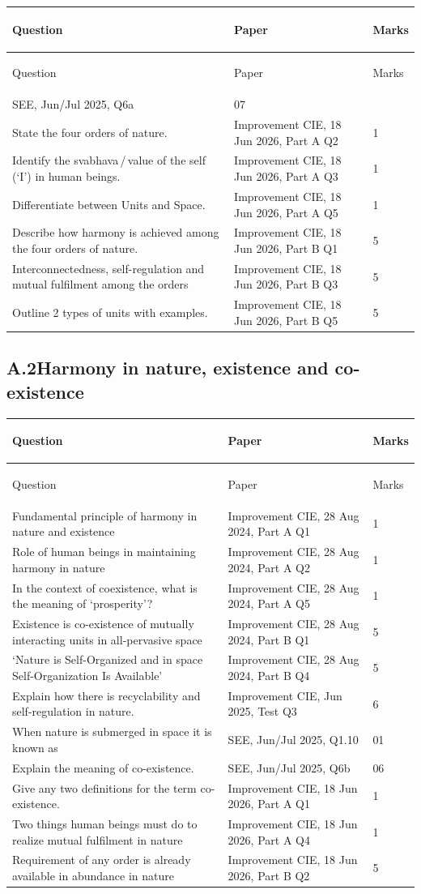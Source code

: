 \documentclass[11pt,a4paper,oneside]{book}
\newcommand{\hdr}[1]{{\sffamily\bfseries\color{white}\strut #1}}
\newenvironment{idxtable}
  {\renewcommand{\arraystretch}{1.3}%
   \arrayrulecolor{rulegrey}%
   \setlength{\LTpre}{6pt}\setlength{\LTpost}{4pt}%
   \begin{longtable}{P{104mm} P{40mm} C{13mm}}
   \rowcolor{slate}
   \hdr{Question} & \hdr{Paper} & \hdr{Marks} \\ \hline \endfirsthead
   \rowcolor{slate}
   \hdr{Question} & \hdr{Paper} & \hdr{Marks} \\ \hline \endhead}
  {\end{longtable}}
\begin{document}
\begin{idxtable}
  SEE, Jun/Jul 2025, Q6a & 07 \\ \hline
State the four orders of nature. &
  Improvement CIE, 18 Jun 2026, Part A Q2 & 1 \\ \hline
Identify the svabhava\,/\,value of the self (`I') in human beings. &
  Improvement CIE, 18 Jun 2026, Part A Q3 & 1 \\ \hline
Differentiate between Units and Space. &
  Improvement CIE, 18 Jun 2026, Part A Q5 & 1 \\ \hline
Describe how harmony is achieved among the four orders of nature. &
  Improvement CIE, 18 Jun 2026, Part B Q1 & 5 \\ \hline
Interconnectedness, self-regulation and mutual fulfilment among the orders &
  Improvement CIE, 18 Jun 2026, Part B Q3 & 5 \\ \hline
Outline 2 types of units with examples. &
  Improvement CIE, 18 Jun 2026, Part B Q5 & 5 \\ \hline
\end{idxtable}

\subsection*{A.2\enspace Harmony in nature, existence and co-existence}

\begin{idxtable}
Fundamental principle of harmony in nature and existence &
  Improvement CIE, 28 Aug 2024, Part A Q1 & 1 \\ \hline
Role of human beings in maintaining harmony in nature &
  Improvement CIE, 28 Aug 2024, Part A Q2 & 1 \\ \hline
In the context of coexistence, what is the meaning of `prosperity'? &
  Improvement CIE, 28 Aug 2024, Part A Q5 & 1 \\ \hline
Existence is co-existence of mutually interacting units in all-pervasive
  space & Improvement CIE, 28 Aug 2024, Part B Q1 & 5 \\ \hline
`Nature is Self-Organized and in space Self-Organization Is Available' &
  Improvement CIE, 28 Aug 2024, Part B Q4 & 5 \\ \hline
Explain how there is recyclability and self-regulation in nature. &
  Improvement CIE, Jun 2025, Test Q3 & 6 \\ \hline
When nature is submerged in space it is known as &
  SEE, Jun/Jul 2025, Q1.10 & 01 \\ \hline
Explain the meaning of co-existence. & SEE, Jun/Jul 2025, Q6b & 06 \\ \hline
Give any two definitions for the term co-existence. &
  Improvement CIE, 18 Jun 2026, Part A Q1 & 1 \\ \hline
Two things human beings must do to realize mutual fulfilment in nature &
  Improvement CIE, 18 Jun 2026, Part A Q4 & 1 \\ \hline
Requirement of any order is already available in abundance in nature &
  Improvement CIE, 18 Jun 2026, Part B Q2 & 5 \\ \hline
\end{idxtable}
\end{document}
